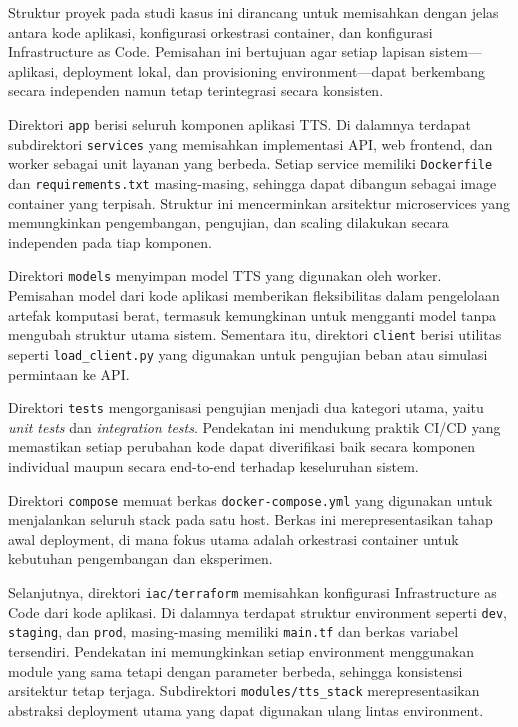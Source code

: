 Struktur proyek pada studi kasus ini dirancang untuk memisahkan dengan jelas antara kode aplikasi, konfigurasi orkestrasi container, dan konfigurasi Infrastructure as Code. Pemisahan ini bertujuan agar setiap lapisan sistem—aplikasi, deployment lokal, dan provisioning environment—dapat berkembang secara independen namun tetap terintegrasi secara konsisten.

Direktori \texttt{app} berisi seluruh komponen aplikasi TTS. Di dalamnya terdapat subdirektori \texttt{services} yang memisahkan implementasi API, web frontend, dan worker sebagai unit layanan yang berbeda. Setiap service memiliki \texttt{Dockerfile} dan \texttt{requirements.txt} masing-masing, sehingga dapat dibangun sebagai image container yang terpisah. Struktur ini mencerminkan arsitektur microservices yang memungkinkan pengembangan, pengujian, dan scaling dilakukan secara independen pada tiap komponen.

Direktori \texttt{models} menyimpan model TTS yang digunakan oleh worker. Pemisahan model dari kode aplikasi memberikan fleksibilitas dalam pengelolaan artefak komputasi berat, termasuk kemungkinan untuk mengganti model tanpa mengubah struktur utama sistem. Sementara itu, direktori \texttt{client} berisi utilitas seperti \texttt{load\_client.py} yang digunakan untuk pengujian beban atau simulasi permintaan ke API.

Direktori \texttt{tests} mengorganisasi pengujian menjadi dua kategori utama, yaitu \textit{unit tests} dan \textit{integration tests}. Pendekatan ini mendukung praktik CI/CD yang memastikan setiap perubahan kode dapat diverifikasi baik secara komponen individual maupun secara end-to-end terhadap keseluruhan sistem.

Direktori \texttt{compose} memuat berkas \texttt{docker-compose.yml} yang digunakan untuk menjalankan seluruh stack pada satu host. Berkas ini merepresentasikan tahap awal deployment, di mana fokus utama adalah orkestrasi container untuk kebutuhan pengembangan dan eksperimen.

Selanjutnya, direktori \texttt{iac/terraform} memisahkan konfigurasi Infrastructure as Code dari kode aplikasi. Di dalamnya terdapat struktur environment seperti \texttt{dev}, \texttt{staging}, dan \texttt{prod}, masing-masing memiliki \texttt{main.tf} dan berkas variabel tersendiri. Pendekatan ini memungkinkan setiap environment menggunakan module yang sama tetapi dengan parameter berbeda, sehingga konsistensi arsitektur tetap terjaga. Subdirektori \texttt{modules/tts\_stack} merepresentasikan abstraksi deployment utama yang dapat digunakan ulang lintas environment.

